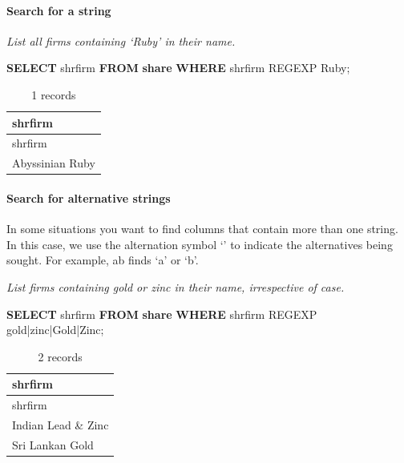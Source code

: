 \documentclass[
]{article}
\newenvironment{Shaded}{\begin{snugshade}}{\end{snugshade}}
\newcommand{\KeywordTok}[1]{\textcolor[rgb]{0.13,0.29,0.53}{\textbf{#1}}}
\newcommand{\NormalTok}[1]{#1}
\newcommand{\StringTok}[1]{\textcolor[rgb]{0.31,0.60,0.02}{#1}}
\begin{document}
\hypertarget{search-for-a-string}{%
\paragraph{Search for a string}\label{search-for-a-string}}

\emph{List all firms containing `Ruby' in their name.}

\begin{Shaded}
\begin{Highlighting}[]
\KeywordTok{SELECT}\NormalTok{ shrfirm }\KeywordTok{FROM} \KeywordTok{share} \KeywordTok{WHERE}\NormalTok{ shrfirm REGEXP }\StringTok{\textquotesingle{}Ruby\textquotesingle{}}\NormalTok{;}
\end{Highlighting}
\end{Shaded}

\begin{longtable}[]{@{}l@{}}
\caption{1 records}\tabularnewline
\toprule()
shrfirm \\
\midrule()
\endfirsthead
\toprule()
shrfirm \\
\midrule()
\endhead
Abyssinian Ruby \\
\bottomrule()
\end{longtable}

\hypertarget{search-for-alternative-strings}{%
\paragraph{Search for alternative
strings}\label{search-for-alternative-strings}}

In some situations you want to find columns that contain more than one
string. In this case, we use the alternation symbol `\textbar{}' to
indicate the alternatives being sought. For example, a\textbar b finds
`a' or `b'.

\emph{List firms containing gold or zinc in their name, irrespective of
case.}

\begin{Shaded}
\begin{Highlighting}[]
\KeywordTok{SELECT}\NormalTok{ shrfirm }\KeywordTok{FROM} \KeywordTok{share} \KeywordTok{WHERE}\NormalTok{ shrfirm REGEXP }\StringTok{\textquotesingle{}gold|zinc|Gold|Zinc\textquotesingle{}}\NormalTok{;}
\end{Highlighting}
\end{Shaded}

\begin{longtable}[]{@{}l@{}}
\caption{2 records}\tabularnewline
\toprule()
shrfirm \\
\midrule()
\endfirsthead
\toprule()
shrfirm \\
\midrule()
\endhead
Indian Lead \& Zinc \\
Sri Lankan Gold \\
\bottomrule()
\end{longtable}
\end{document}
